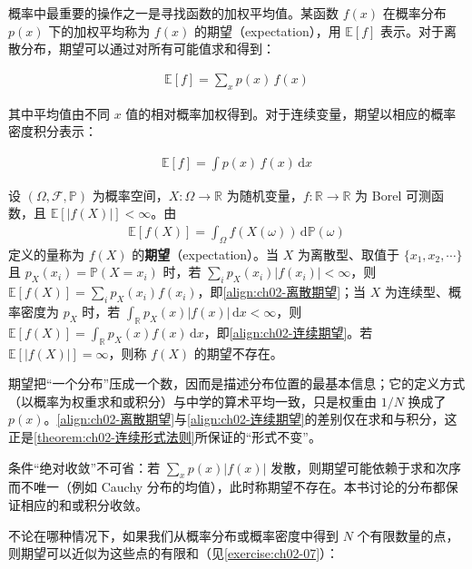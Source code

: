 \documentclass[../../main.tex]{subfiles}
\begin{document}
概率中最重要的操作之一是寻找函数的加权平均值。某函数 $f(x)$ 在概率分布 $p(x)$ 下的加权平均称为 $f(x)$ 的期望（expectation），用 $\mathbb{E}[f]$ 表示。对于离散分布，期望可以通过对所有可能值求和得到：

\begin{align}
  \mathbb{E}[f] = \sum_{x} p(x)\,f(x)
  \label{align:ch02-离散期望}
\end{align}

其中平均值由不同 $x$ 值的相对概率加权得到。对于连续变量，期望以相应的概率密度积分表示：

\begin{align}
  \mathbb{E}[f] = \int p(x)\,f(x)\,\mathrm{d}x
  \label{align:ch02-连续期望}
\end{align}

\begin{definition}[期望]\label{definition:ch02-期望}
设 $(\Omega,\mathcal{F},\mathbb{P})$ 为概率空间，$X:\Omega\to\mathbb{R}$ 为随机变量，$f:\mathbb{R}\to\mathbb{R}$ 为 Borel 可测函数，且 $\mathbb{E}[|f(X)|]<\infty$。由
\begin{align*}
  \mathbb{E}[f(X)]=\int_{\Omega}f(X(\omega))\,\mathrm{d}\mathbb{P}(\omega)
\end{align*}
定义的量称为 $f(X)$ 的\textbf{期望}（expectation）。当 $X$ 为离散型、取值于 $\{x_1,x_2,\cdots\}$ 且 $p_X(x_i)=\mathbb{P}(X=x_i)$ 时，若 $\sum_i p_X(x_i)|f(x_i)|<\infty$，则 $\mathbb{E}[f(X)]=\sum_i p_X(x_i)f(x_i)$，即\eqref{align:ch02-离散期望}；当 $X$ 为连续型、概率密度为 $p_X$ 时，若 $\int_{\mathbb{R}}p_X(x)|f(x)|\,\mathrm{d}x<\infty$，则 $\mathbb{E}[f(X)]=\int_{\mathbb{R}}p_X(x)f(x)\,\mathrm{d}x$，即\eqref{align:ch02-连续期望}。若 $\mathbb{E}[|f(X)|]=\infty$，则称 $f(X)$ 的期望不存在。
\end{definition}

\begin{remark}
期望把“一个分布”压成一个数，因而是描述分布位置的最基本信息；它的定义方式（以概率为权重求和或积分）与中学的算术平均一致，只是权重由 $1/N$ 换成了 $p(x)$。\eqref{align:ch02-离散期望}与\eqref{align:ch02-连续期望}的差别仅在求和与积分，这正是\cref{theorem:ch02-连续形式法则}所保证的“形式不变”。

条件“绝对收敛”不可省：若 $\sum_x p(x)|f(x)|$ 发散，则期望可能依赖于求和次序而不唯一（例如 Cauchy 分布的均值），此时称期望不存在。本书讨论的分布都保证相应的和或积分收敛。
\end{remark}

不论在哪种情况下，如果我们从概率分布或概率密度中得到 $N$ 个有限数量的点，则期望可以近似为这些点的有限和（见\cref{exercise:ch02-07}）：
\end{document}
